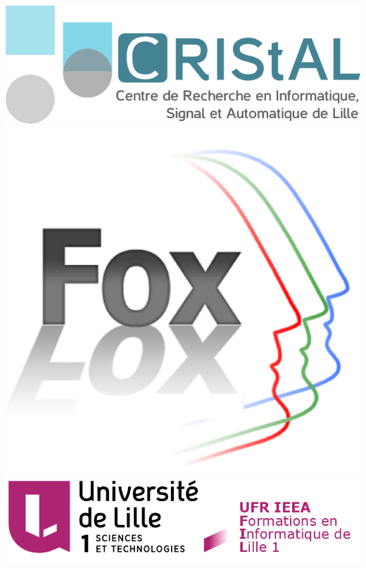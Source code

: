 \documentclass[12pt]{article}
\begin{document}
\begin{titlepage}
\includegraphics[scale=0.5]{logoCRIStAL.png} \hspace{0.5cm}
\includegraphics[scale=0.15]{logoFOX.png}\\[1cm]
\includegraphics[scale=0.3]{logo.png}

\pagebreak

\end{titlepage}


\setcounter{page}{0}
\renewcommand{\contentsname}{Sommaire}
\tableofcontents
\thispagestyle{empty}
\end{document}
